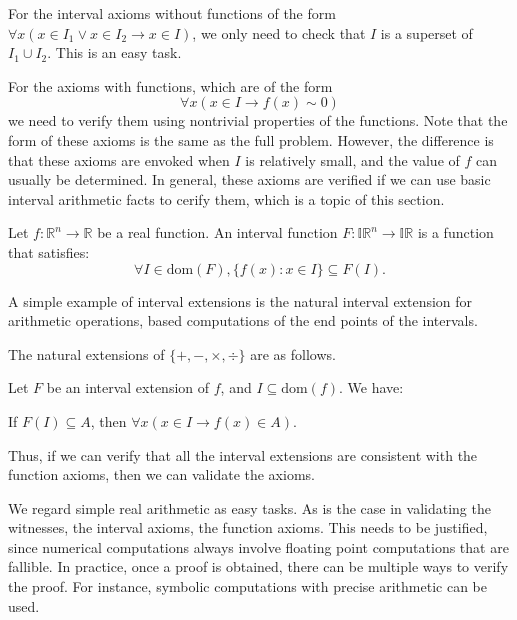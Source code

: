 \documentclass[envcountsect]{llncs}
\newcommand{\dom}{\mathrm{dom}}
\begin{document}
For the interval axioms without functions of the form $\forall x(x\in I_1\vee
x\in I_2\rightarrow x\in I)$, we only need to check that $I$ is a superset of
$I_1\cup I_2$. This is an easy task. 

For the axioms with functions, which are of the form 
$$\forall x (x\in I \rightarrow f(x)\sim 0)$$
we need to verify them using nontrivial properties of the functions. Note that
the form of these axioms is the same as the full problem. However, the
difference is that these axioms are envoked when $I$ is relatively small, and
the value of $f$ can usually be determined. In general, these axioms are
verified if we can use basic interval arithmetic facts to cerify them, which is
a topic of this section. 

\begin{definition}
Let $f: \mathbb{R}^n\rightarrow \mathbb{R}$ be a real function. An interval
function $F: \mathbb{IR}^n \rightarrow \mathbb{IR}$ is a function that
satisfies: 
$$\forall I\in \dom(F), \{f(x): x\in I\}\subseteq F(I).$$
\end{definition}

A simple example of interval extensions is the natural interval extension for
arithmetic operations, based computations of the end points of the intervals. 
\begin{example}
The natural extensions of $\{+, -, \times, \div\}$ are as follows. 
\end{example}

\begin{proposition}
Let $F$ be an interval extension of $f$, and $I\subseteq \dom(f)$. We have:
\begin{center}
If $F(I)\subseteq A$, then $\forall x (x\in I \rightarrow f(x)\in A)$. 
\end{center}
\end{proposition}
Thus, if we can verify that all the interval extensions are consistent with the
function axioms, then we can validate the axioms. 

\begin{remark}
We regard simple real arithmetic as easy tasks. 
As is the case in validating the witnesses, the interval axioms, the function
axioms. This needs to be justified, since numerical computations always involve
floating point computations that are fallible. In practice, once a proof is
obtained, there can be multiple ways to verify the proof. For instance, symbolic
computations with precise arithmetic can be used.  
\end{remark}
\end{document}
